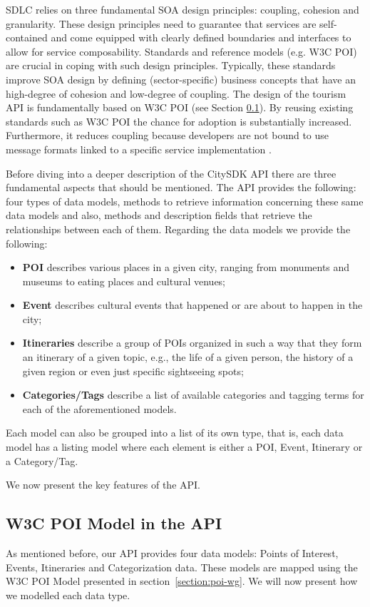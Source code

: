 \documentclass[times]{ettauth}
\begin{document}
SDLC relies on three fundamental SOA design principles: coupling, cohesion and granularity. These design principles need to guarantee that services are self-contained and come equipped with clearly defined boundaries and interfaces to allow for service composability. Standards and reference models (e.g. W3C POI) are crucial in coping with such design principles. Typically, these standards improve SOA design by defining (sector-specific) business concepts that have an high-degree of cohesion and low-degree of coupling. The design of the tourism API is fundamentally based on W3C POI (see Section \ref{section:w3cpoi}). By reusing existing standards such as W3C POI the chance for adoption is substantially increased. Furthermore, it reduces coupling because developers are not bound to use message formats linked to a specific service implementation \cite{papazoglou2007}.

Before diving into a deeper description of the CitySDK API there are three fundamental aspects that should be mentioned. The API provides the following: four types of data models, methods to retrieve information concerning these same data models and also, methods and description fields that retrieve the relationships between each of them. Regarding the data models we provide the following:
\begin{itemize}
\item \textbf{\ac{POI}} describes various places in a given city, ranging from monuments and museums to eating places and cultural venues; 
\item \textbf{Event} describes cultural events that happened or are about to happen in the city;
\item \textbf{Itineraries} describe a group of \acp{POI} organized in such a way that they form an itinerary of a given topic, e.g., the life of a given person, the history of a given region or even just specific sightseeing spots;
\item \textbf{Categories/Tags} describe a list of available categories and tagging terms for each of the aforementioned models.
\end{itemize}

Each model can also be grouped into a list of its own type, that is, each data model has a listing model where each element is either a \ac{POI}, Event, Itinerary or a Category/Tag.

We now present the key features of the API.

\subsection{W3C POI Model in the API}
\label{section:w3cpoi}
As mentioned before, our API provides four data models: Points of Interest, Events, Itineraries and Categorization data. These models are mapped using the W3C POI Model presented in section~\ref{section:poi-wg}. We will now present how we modelled each data type.
\end{document}

